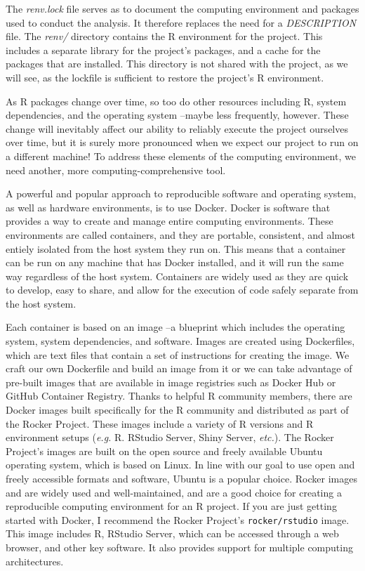 \documentclass[
  letterpaper,
  krantz1]{latex/krantz-mod}
\theoremstyle{definition}
\theoremstyle{definition}
\theoremstyle{remark}
\begin{document}
The \emph{renv.lock} file serves as to document the computing
environment and packages used to conduct the analysis. It therefore
replaces the need for a \emph{DESCRIPTION} file. The \emph{renv/}
directory contains the R environment for the project. This includes a
separate library for the project's packages, and a cache for the
packages that are installed. This directory is not shared with the
project, as we will see, as the lockfile is sufficient to restore the
project's R environment.

As R packages change over time, so too do other resources including R,
system dependencies, and the operating system --maybe less frequently,
however. These change will inevitably affect our ability to reliably
execute the project ourselves over time, but it is surely more
pronounced when we expect our project to run on a different machine! To
address these elements of the computing environment, we need another,
more computing-comprehensive tool.

A powerful and popular approach to reproducible software and operating
system, as well as hardware environments, is to use Docker. Docker is
software that provides a way to create and manage entire computing
environments. These environments are called containers, and they are
portable, consistent, and almost entiely isolated from the host system
they run on. This means that a container can be run on any machine that
has Docker installed, and it will run the same way regardless of the
host system. Containers are widely used as they are quick to develop,
easy to share, and allow for the execution of code safely separate from
the host system.

Each container is based on an image --a blueprint which includes the
operating system, system dependencies, and software. Images are created
using Dockerfiles, which are text files that contain a set of
instructions for creating the image. We craft our own Dockerfile and
build an image from it or we can take advantage of pre-built images that
are available in image registries such as Docker Hub or GitHub Container
Registry. Thanks to helpful R community members, there are Docker images
built specifically for the R community and distributed as part of the
Rocker Project. These images include a variety of R versions and R
environment setups (\emph{e.g.} R. RStudio Server, Shiny Server,
\emph{etc.}). The Rocker Project's images are built on the open source
and freely available Ubuntu operating system, which is based on Linux.
In line with our goal to use open and freely accessible formats and
software, Ubuntu is a popular choice. Rocker images and are widely used
and well-maintained, and are a good choice for creating a reproducible
computing environment for an R project. If you are just getting started
with Docker, I recommend the Rocker Project's \texttt{rocker/rstudio}
image. This image includes R, RStudio Server, which can be accessed
through a web browser, and other key software. It also provides support
for multiple computing architectures.
\end{document}
